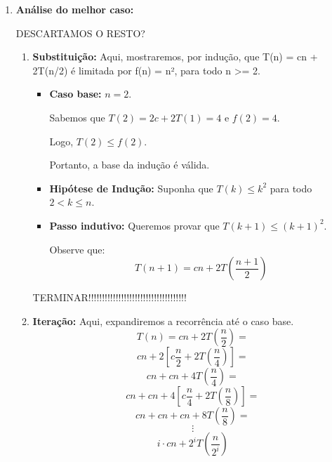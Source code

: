 \begin{enumerate}
    \item \textbf{Análise do melhor caso:}



        DESCARTAMOS O RESTO?
        
        \begin{enumerate}
            \item \textbf{Substituição:}
            Aqui, mostraremos, por indução, que T(n) = cn + 2T(n/2) é limitada por f(n) = n², para todo n >= 2.
            \begin{itemize}
            \item \textbf{Caso base:} \( n = 2 \).
            
            Sabemos que \( T(2) = 2c + 2T(1) = 4 \) e \( f(2) = 4 \).
            
            Logo, \( T(2) \leq f(2) \).
            
            Portanto, a base da indução é válida.
            
            \item \textbf{Hipótese de Indução:} Suponha que \( T(k) \leq k^2 \) para todo \( 2 < k \leq n \).
            
            \item \textbf{Passo indutivo:} Queremos provar que \( T(k+1) \leq (k+1)^2 \).
            
            Observe que:
              \[
              T(n+1) = cn + 2T\left(\frac{n+1}{2}\right)
              \]
              
            \end{itemize}
            
TERMINAR!!!!!!!!!!!!!!!!!!!!!!!!!!!!!!!!!!!!
            
            \item \textbf{Iteração:}
            Aqui, expandiremos a recorrência até o caso base.
            \[
            T(n) = cn + 2T\left(\frac{n}{2}\right) =
            \]
            \[
            cn + 2\left[c\frac{n}{2} + 2T\left(\frac{n}{4}\right)\right] =
            \]
            \[
            cn + cn + 4T\left(\frac{n}{4}\right) =
            \]
            \[
            cn + cn + 4\left[c\frac{n}{4} + 2T\left(\frac{n}{8}\right)\right] =
            \]
            \[
            cn + cn + cn + 8T\left(\frac{n}{8}\right) =
            \]
            \[
            \vdots
            \]
            \[
            i \cdot cn + 2^i T\left(\frac{n}{2^i}\right)
            \]
            

\end{enumerate}
\end{enumerate}
